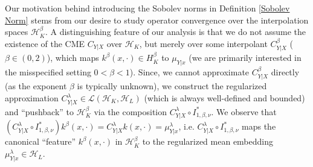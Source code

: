 \documentclass[accepted]{article}
\theoremstyle{definition}
\begin{document}

Our motivation behind introducing the Sobolev norms in Definition \ref{Sobolev Norm} stems from our desire to study operator convergence over the interpolation spaces $\mathcal{H}^{\beta}_K$. A distinguishing feature of our analysis is that we do not assume the existence of the CME $C_{Y|X}$ over $\mathcal{H}_K$, but merely over some interpolant $C^{\beta}_{Y|X}$ ($\beta \in (0, 2)$), which maps $k^{\beta}(x, \cdot) \in H^{\beta}_{K}$ to $\mu_{Y|x}$ (we are primarily interested in the misspecified setting  $0 < \beta < 1$).  Since, we cannot approximate $C^{\beta}_{Y|X}$ directly (as the exponent $\beta$ is typically unknown), we construct the regularized approximation $C^{\lambda}_{Y|X} \in \mathcal{L}(\mathcal{H}_K, \mathcal{H}_L)$ (which is always well-defined and bounded) and ``pushback'' to $\mathcal{H}^{\beta}_K$ via the composition $C^{\lambda}_{Y|X} \circ I^{*}_{1, \beta, \nu}$. We observe that $(C^{\lambda}_{Y|X} \circ I^{*}_{1, \beta, \nu}) k^{\beta}(x, \cdot) = C^{\lambda}_{Y|X}k(x, \cdot) = \mu^{\lambda}_{Y|x}$, i.e. $C^{\lambda}_{Y|X} \circ I^{*}_{1, \beta, \nu}$ maps the canonical ``feature'' $k^{\beta}(x, \cdot)$ in $\mathcal{H}^{\beta}_K$ to the regularized mean embedding $\mu^{\lambda}_{Y|x} \in \mathcal{H}_L$. 
\end{document}
